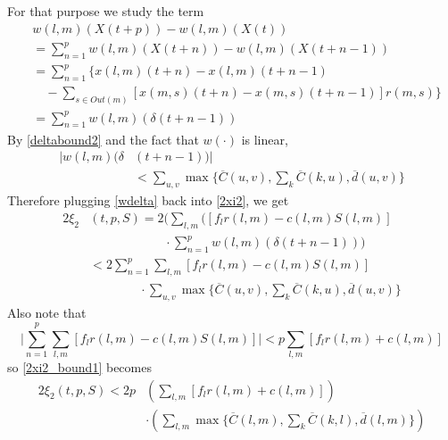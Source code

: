 %
For that purpose we study the term
\begin{align} \nonumber
&w(l,m)(X(t+p))   -  w(l,m)(X(t)) \\ \nonumber
& = \sum_{n=1}^{p} w(l,m)(X(t+n)) - w(l,m)(X(t + n - 1)) \\ \nonumber
&= \sum_{n=1}^{p} \Big\{ x(l,m)(t + n) - x(l,m)(t + n - 1)   \\ \nonumber 
&  \quad - \sum_{s \in Out(m)}[ x(m,s)(t + n) - x(m,s)(t + n - 1) ]r(m,s)  \Big\} \\ 
&= \sum_{n=1}^{p}  w(l,m)( \delta(t + n - 1)) 
\end{align}
By \eqref{deltabound2} and the fact that $w(\cdot)$ is linear,  
\begin{align} \nonumber
\vert w(l,m)(\delta&(t + n -1)) \vert \\  \label{wdelta}
&< \sum_{u,v} \max\Big\{  \overline{C}(u,v), \sum_{k}\overline{C}(k,u), \overline{d}(u,v)\Big\}
\end{align}
Therefore plugging \eqref{wdelta} back into \eqref{2xi2}, we get
\begin{align} \nonumber 
2\xi_2&(t,p,S) = 2\bigg( \sum_{l,m}\big([f_{l}r(l,m) - c(l,m)S(l,m)] \\  \nonumber
&\qquad \qquad \qquad \cdot \sum_{n=1}^{p}  w(l,m)( \delta(t + n - 1))\bigg)  \\ \nonumber
&< 2 \sum_{n=1}^{p}  \sum_{l,m}[f_{l}r(l,m) - c(l,m)S(l,m)] \\ 
&\qquad \qquad \cdot\sum_{u,v} \max\Big\{  \overline{C}(u,v), \sum_{k}\overline{C}(k,u), \overline{d}(u,v)\Big\} \label{2xi2_bound1}
\end{align}
Also note that 
\begin{equation}
\vert \sum_{n=1}^{p}  \sum_{l,m}[f_{l}r(l,m) - c(l,m)S(l,m)] \vert < p \sum_{l,m}[f_{l}r(l,m) + c(l,m)]
\end{equation}
so \eqref{2xi2_bound1} becomes
\begin{align} \label{2xi2_bound2}
2\xi_2(t,p,S) < 2 p &\left( \sum_{l,m}[f_{l}r(l,m) + c(l,m)]\right)\\ \nonumber
&\cdot\left( \sum_{l,m} \max\Big\{  \overline{C}(l,m), \sum_{k}\overline{C}(k,l), \overline{d}(l,m)\Big\} \right)
\end{align}


